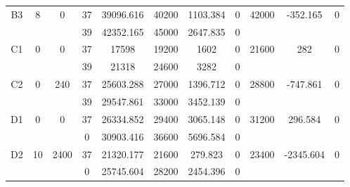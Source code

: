 \begin{sidewaystable}
\begin{tabular}{c||c|c||c|c|c|c|c||c|c|c}
         &
        
      \\
      \hline
      \multirow{2}{*}{B3} &
      \multirow{2}{*}{8} &
      \multirow{2}{*}{0} &
      37 &
      39096.616 &
      40200 &
        1103.384 &
        0 &
      \multirow{2}{*}{42000} &
        \multirow{2}{*}{-352.165} &
        \multirow{2}{*}{0}
      \\
      \cline{4-8}
       &
       &
       &
      39 &
      42352.165 &
      45000 &
        2647.835 &
        0 &
      
         &
        
      \\
      \hline
      \multirow{2}{*}{C1} &
      \multirow{2}{*}{0} &
      \multirow{2}{*}{0} &
      37 &
      17598 &
      19200 &
        1602 &
        0 &
      \multirow{2}{*}{21600} &
        \multirow{2}{*}{282} &
        \multirow{2}{*}{0}
      \\
      \cline{4-8}
       &
       &
       &
      39 &
      21318 &
      24600 &
        3282 &
        0 &
      
         &
        
      \\
      \hline
      \multirow{2}{*}{C2} &
      \multirow{2}{*}{0} &
      \multirow{2}{*}{240} &
      37 &
      25603.288 &
      27000 &
        1396.712 &
        0 &
      \multirow{2}{*}{28800} &
        \multirow{2}{*}{-747.861} &
        \multirow{2}{*}{0}
      \\
      \cline{4-8}
       &
       &
       &
      39 &
      29547.861 &
      33000 &
        3452.139 &
        0 &
      
         &
        
      \\
      \hline
      \multirow{2}{*}{D1} &
      \multirow{2}{*}{0} &
      \multirow{2}{*}{0} &
      37 &
      26334.852 &
      29400 &
        3065.148 &
        0 &
      \multirow{2}{*}{31200} &
        \multirow{2}{*}{296.584} &
        \multirow{2}{*}{0}
      \\
      \cline{4-8}
       &
       &
       &
      0 &
      30903.416 &
      36600 &
        5696.584 &
        0 &
      
         &
        
      \\
      \hline
      \multirow{2}{*}{D2} &
      \multirow{2}{*}{10} &
      \multirow{2}{*}{2400} &
      37 &
      21320.177 &
      21600 &
        279.823 &
        0 &
      \multirow{2}{*}{23400} &
        \multirow{2}{*}{-2345.604} &
        \multirow{2}{*}{0}
      \\
      \cline{4-8}
       &
       &
       &
      0 &
      25745.604 &
      28200 &
        2454.396 &
        0 &
      

\end{tabular}
\end{sidewaystable}
